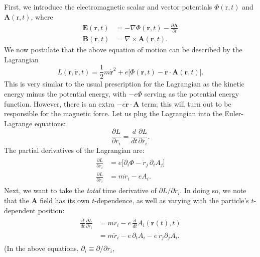 \documentclass[pra,12pt]{revtex4}
\begin{document}
First, we introduce the electromagnetic scalar and vector potentials
$\Phi(\mathrm{r},t)$ and $\mathbf{A}(\mathrm{r},t)$, where
\begin{align}
  \mathbf{E}(\mathbf{r},t) &= - \nabla \Phi(\mathbf{r},t) - \frac{\partial\mathbf{A}}{\partial t} \\
  \mathbf{B}(\mathbf{r},t) &= \nabla \times \mathbf{A}(\mathbf{r},t).
  \label{Bfield}
\end{align}
We now postulate that the above equation of motion can be described by
the Lagrangian
\begin{equation}
  L(\mathbf{r},\dot{\mathbf{r}},t) = \frac{1}{2}m\dot{\mathbf{r}}^2
  + e \Big[\Phi(\mathbf{r},t) - \dot{\mathbf{r}} \cdot \mathbf{A}(\mathbf{r},t)
    \Big].
\end{equation}
This is very similar to the usual prescription for the Lagrangian as
the kinetic energy minus the potential energy, with $-e\Phi$ serving
as the potential energy function.  However, there is an extra
$-e\dot{\mathbf{r}} \cdot \mathbf{A}$ term; this will turn out to be
responsible for the magnetic force.  Let us plug the Lagrangian into
the Euler-Lagrange equations:
\begin{equation}
  \frac{\partial L}{\partial r_i} = \frac{d}{dt}
  \frac{\partial L}{\partial \dot{r}_i}.
\end{equation}
The partial derivatives of the Lagrangian are:
\begin{align}
  \begin{aligned}
    \frac{\partial L}{\partial r_i} &=
    e\Big[\partial_i \Phi - \dot{r}_j \,\partial_i A_j \Big]\\
    \frac{\partial L}{\partial \dot{r}_i} &= m\dot{r}_i - e A_i.
  \end{aligned}
\end{align}
Next, we want to take the \textit{total} time derivative of $\partial
L /\partial \dot{r}_i$.  In doing so, we note that the $\mathbf{A}$
field has its own $t$-dependence, as well as varying with the
particle's $t$-dependent position:
\begin{align}
  \begin{aligned}
    \frac{d}{dt} \frac{\partial L}{\partial \dot{r}_i}
    &= m\ddot{r}_i - e\, \frac{d}{dt} A_i(\mathbf{r}(t),t) \\
    &= m\ddot{r}_i - e\, \partial_t A_i
    - e\, \dot{r}_j \partial_j A_i.
  \end{aligned}
\end{align}
(In the above equations, $\partial_i \equiv \partial/\partial r_i$,
\end{document}
